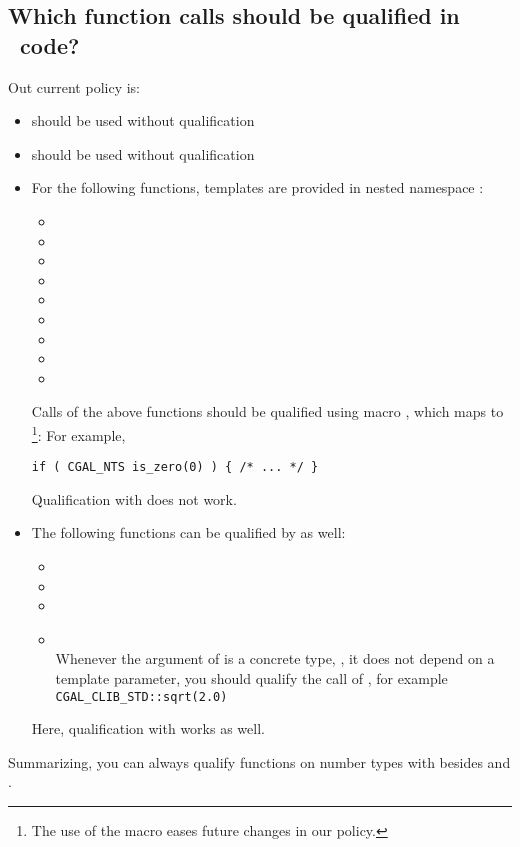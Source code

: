 \subsection{Which function calls should be qualified in \cgal\ code?}
Out current policy is:
\begin{itemize}
\item
{} should be used without qualification
\item
{} should be used without qualification
\item
For the following functions, templates are provided in nested namespace
:
\begin{itemize}
\item[]
\item[]
\item[]
\item[]
\item[]
\item[]
\item[]
\item[]
\item[]
\end{itemize}
Calls of the above functions should be qualified using macro 
,%
which maps to \footnote{The use of
the macro eases future changes in our policy.}: For example,
\begin{verbatim}
if ( CGAL_NTS is_zero(0) ) { /* ... */ } 
\end{verbatim}
Qualification with  does not work.
\item
The following functions can be qualified by  as well:
\begin{itemize} 
\item[]
\item[]
\item[]
\item[]\\
Whenever the argument of  is a concrete type, \ie, it does
not depend on a template parameter, you should qualify the call of
, for example \verb+CGAL_CLIB_STD::sqrt(2.0)+
\end{itemize}
Here, qualification with  works as well.
\end{itemize}
Summarizing, you can always qualify functions on number types
with  besides  and .

